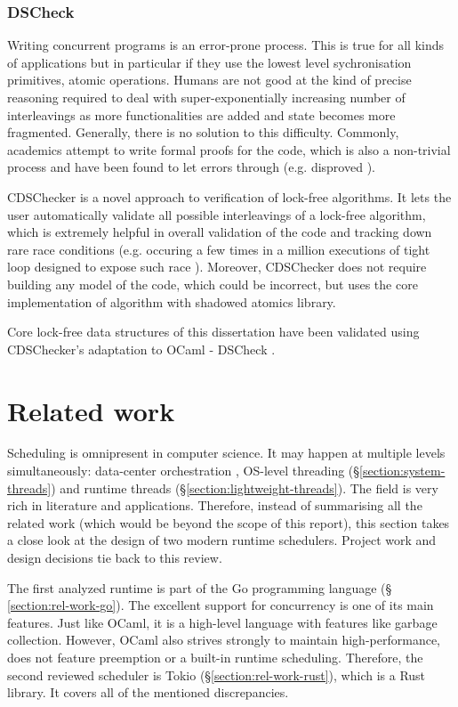 \documentclass[12pt,a4paper,twoside]{report}
\begin{document}
\subsection{DSCheck}
\label{section:background_dscheck}
Writing concurrent programs is an error-prone process. This is true for all kinds of applications but in particular if they use the lowest level sychronisation primitives, atomic operations. Humans are not good at the kind of precise reasoning required to deal with super-exponentially increasing number of interleavings as more functionalities are added and state becomes more fragmented. Generally, there is no solution to this difficulty. Commonly, academics attempt to write formal proofs for the code, which is also a non-trivial process and have been found to let errors through (e.g. \cite{Norris2013} disproved \cite{correct_and_efficiect_deque}). 

CDSChecker \cite{Norris2013} is a novel approach to verification of lock-free algorithms. It lets the user automatically validate all possible interleavings of a lock-free algorithm, which is extremely helpful in overall validation of the code and tracking down rare race conditions (e.g. occuring a few times in a million executions of tight loop designed to expose such race \cite{litmus}). Moreover, CDSChecker does not require building any model of the code, which could be incorrect, but uses the core implementation of algorithm with shadowed atomics library. 

Core lock-free data structures of this dissertation have been validated using CDSChecker's adaptation to OCaml - DSCheck \cite{sadiqjds97:online}. 

\chapter{Related work}

Scheduling is omnipresent in computer science. It may happen at multiple levels simultaneously: data-center orchestration \cite{NomadbyH95:online}, OS-level threading (\S\ref{section:system-threads}) and runtime threads (\S\ref{section:lightweight-threads}). The field is very rich in literature and applications. Therefore, instead of summarising all the related work (which would be beyond the scope of this report), this section takes a close look at the design of two modern runtime schedulers. Project work and design decisions tie back to this review. 

The first analyzed runtime is part of the Go programming language (\S
\ref{section:rel-work-go}). The excellent support for concurrency is one of its main features. Just like OCaml, it is a high-level language with features like garbage collection. However, OCaml also strives strongly to maintain high-performance, does not feature preemption or a built-in runtime scheduling. Therefore, the second reviewed scheduler is Tokio (\S\ref{section:rel-work-rust}), which is a Rust library. It covers all of the mentioned discrepancies.
\end{document}
